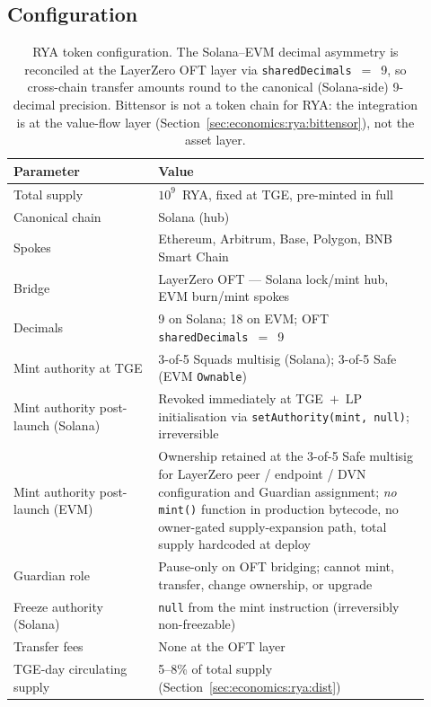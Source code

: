 \documentclass[11pt,a4paper]{article}
\begin{document}
\subsection{Configuration}\label{sec:economics:rya:config}

\begin{table}[h]
\centering
\small
\begin{tabular}{p{0.32\linewidth}p{0.60\linewidth}}
\toprule
\textbf{Parameter} & \textbf{Value} \\
\midrule
Total supply & $10^9$~RYA, fixed at TGE, pre-minted in full \\
Canonical chain & Solana (hub) \\
Spokes & Ethereum, Arbitrum, Base, Polygon, BNB Smart Chain \\
Bridge & LayerZero OFT --- Solana lock/mint hub, EVM
        burn/mint spokes~\cite{zarick2024layerzero,layerzero2024oft} \\
Decimals & 9 on Solana; 18 on EVM; OFT \texttt{sharedDecimals}~$=$~9 \\
Mint authority at TGE & 3-of-5 Squads multisig (Solana); 3-of-5 Safe (EVM
                       \texttt{Ownable}) \\
Mint authority post-launch (Solana) & Revoked immediately at TGE~$+$~LP
                             initialisation via \texttt{setAuthority(mint, null)};
                             irreversible \\
Mint authority post-launch (EVM)    & Ownership retained at the 3-of-5 Safe multisig
                             for LayerZero peer / endpoint / DVN configuration and
                             Guardian assignment; \emph{no} \texttt{mint()} function
                             in production bytecode, no owner-gated supply-expansion
                             path, total supply hardcoded at deploy \\
Guardian role               & Pause-only on OFT bridging; cannot mint, transfer,
                             change ownership, or upgrade \\
Freeze authority (Solana) & \texttt{null} from the mint instruction (irreversibly
                            non-freezable) \\
Transfer fees & None at the OFT layer \\
TGE-day circulating supply & 5--8\% of total supply
                            (Section~\ref{sec:economics:rya:dist}) \\
\bottomrule
\end{tabular}
\caption{RYA token configuration. The Solana--EVM decimal asymmetry is reconciled at
the LayerZero OFT layer via \texttt{sharedDecimals}~$=$~9, so cross-chain transfer
amounts round to the canonical (Solana-side) 9-decimal precision. Bittensor is not a
token chain for RYA: the integration is at the value-flow layer
(Section~\ref{sec:economics:rya:bittensor}), not the asset layer.}
\label{tab:rya-config}
\end{table}
\end{document}

